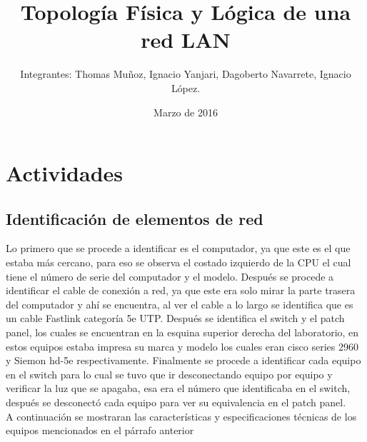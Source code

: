 \documentclass{udpreport}
\title{Topología Física y Lógica de una red LAN}
\author{Integrantes: Thomas Muñoz, Ignacio Yanjari, Dagoberto Navarrete, Ignacio López.}
\date{Marzo de 2016}
\begin{document}
\maketitle
\tableofcontents
\chapter{Actividades}
	\section{Identificación de elementos de red}
		Lo primero que se procede a identificar es el computador, ya que este es el que estaba más cercano, para eso se observa  		el costado izquierdo de la CPU el cual tiene el número de serie del computador y el modelo. Después se procede a identificar 		el cable de conexión a red,  ya que este era solo mirar la parte trasera del computador y ahí se encuentra, al ver el cable 		a lo largo se identifica que es un cable Fastlink categoría 5e UTP. Después se identifica el switch y el patch panel, los 		cuales se encuentran en la esquina superior derecha del laboratorio, en estos equipos estaba impresa su marca y modelo 		los cuales eran cisco series 2960 y Siemon hd-5e respectivamente. Finalmente se procede a identificar cada equipo en 			el switch para lo cual se tuvo que ir desconectando equipo por equipo y verificar la luz que se apagaba, esa era el 		número que identificaba en el switch, después se desconectó cada equipo para ver su equivalencia en el patch panel.\\
		A continuación se mostraran las características y especificaciones técnicas de los equipos mencionados en el párrafo 			anterior\\
\end{document}
